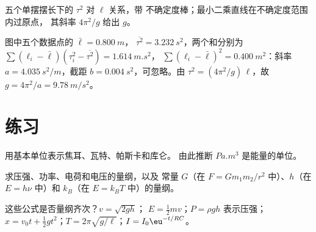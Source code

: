 \begin{omfigure}

{\small 五个单摆摆长下的 $\tau^2$ 对 $\ell$ 关系，带
不确定度棒；最小二乘直线在不确定度范围内过原点，
其斜率 $4\pi^2/g$ 给出 $g$。}
\end{omfigure}

\begin{example}[由斜率读取 $g$]\label{ex:b1:units-dimensions:slope}
图中五个数据点的 $\bar\ell = \qty{0.800}{m}$，
$\overline{\tau^2} = \qty{3.232}{s^2}$，两个和分别为
$\sum (\ell_i - \bar\ell)(\tau_i^2 - \overline{\tau^2}) = \qty{1.614}{m.s^2}$，
$\sum (\ell_i - \bar\ell)^2 = \qty{0.400}{m^2}$：斜率
$a = \qty{4.035}{s^2/m}$，截距 $b = \qty{0.004}{s^2}$，可忽略。由
$\tau^2 = (4\pi^2/g)\,\ell$，故 $g = 4\pi^2/a = \qty{9.78}{m/s^2}$。
\end{example}

\section{练习}

\begin{exercise}[$\star$]\label{exo:b1:units-dimensions:1}
用基本单位表示焦耳、瓦特、帕斯卡和库仑。
由此推断 $\unit{Pa.m^3}$ 是能量的单位。
\end{exercise}

\begin{exercise}[$\star$]\label{exo:b1:units-dimensions:2}
求压强、功率、电荷和电压的量纲，以及
常量 $G$（在 $F = Gm_1m_2/r^2$ 中）、$h$（在
$E = h\nu$ 中）和 $k_B$（在 $E = k_B T$ 中）的量纲。
\end{exercise}

\begin{exercise}[$\star$]\label{exo:b1:units-dimensions:3}
这些公式是否量纲齐次？$v = \sqrt{2gh}$；
$E = \tfrac12 m v$；$P = \rho g h$ 表示压强；$x = v_0 t +
\tfrac12 g t^2$；$T = 2\pi\sqrt{g/\ell}$；$I = I_0 \eu^{-t/RC}$。
\end{exercise}

